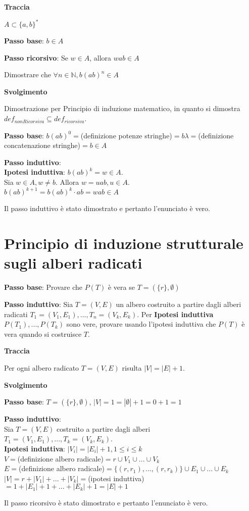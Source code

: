 \begin{example}
\phantom{}
\centerline{\textbf{Traccia}}

$A \subset \{a, b\}^*$

\textbf{Passo base}: $b \in A$

\textbf{Passo ricorsivo}: Se $w \in A$, allora $wab \in A$

Dimostrare che $\forall n \in \mathbb{N}, b(ab)^n \in A$

\centerline{\textbf{Svolgimento}}

Dimostrazione per Principio di induzione matematico, in quanto si dimostra $def_{nonRicorsiva} \subseteq def_{ricorsiva}$.

\textbf{Passo base}: $b(ab)^0 =$(definizione potenze stringhe)$= b \lambda =$(definizione concatenazione stringhe)$= b \in A$

\textbf{Passo induttivo}: \\
\textbf{Ipotesi induttiva}: $b(ab)^k = w \in A$. \\
Sia $w \in A, w \neq b$. Allora $w = uab, u \in A$. \\
$b(ab)^{k+1} = b(ab)^k \cdot ab = wab \in A$

Il passo induttivo è stato dimostrato e pertanto l'enunciato è vero.

\end{example}

\section{Principio di induzione strutturale sugli alberi radicati}
\textbf{Passo base}: Provare che $P(T)$ è vera se $T=(\{r\}, \emptyset)$

\textbf{Passo induttivo}: Sia $T=(V, E)$ un albero costruito a partire dagli alberi radicati $T_1=(V_1, E_1), ..., T_n=(V_k, E_k)$. Per \textbf{Ipotesi induttiva} $P(T_1), ..., P(T_k)$ sono vere, provare usando l'ipotesi induttiva che $P(T)$ è vera quando si costruisce $T$.
\begin{example}
\phantom{}
\centerline{\textbf{Traccia}}

Per ogni albero radicato $T=(V, E)$ risulta $|V| = |E| + 1$.

\centerline{\textbf{Svolgimento}}

\textbf{Passo base}: $T=(\{r\}, \emptyset)$, $|V| = 1 = |\emptyset| + 1 = 0 + 1 = 1$

\textbf{Passo induttivo}: \\
Sia $T=(V, E)$ costruito a partire dagli alberi $T_1=(V_1, E_1), ... , T_k=(V_k, E_k)$. \\
\textbf{Ipotesi induttiva}: $|V_i| = |E_i| + 1, 1 \le i \le k$ \\
$V =$(definizione albero radicale)$= r \cup V_1 \cup ... \cup V_k$ \\
$E =$(definizione albero radicale)$= \{(r, r_1), ..., (r, r_k)\} \cup E_1 \cup ... \cup E_k$ \\
$|V| = r + |V_1| + ... + |V_k| =$(ipotesi induttiva)$= 1 + |E_1| + 1 + ... + |E_k| + 1 = |E| + 1$

Il passo ricorsivo è stato dimostrato e pertanto l'enunciato è vero.
\end{example}

